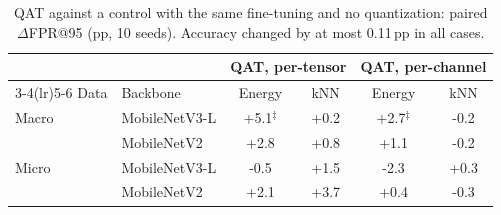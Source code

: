 \begin{table}[t]
\centering
\caption{QAT against a control with the same fine-tuning and no quantization: paired $\Delta$FPR@95 (pp, 10 seeds). Accuracy changed by at most 0.11\,pp in all cases.}
\label{tab:qat}
\setlength{\tabcolsep}{3pt}
\footnotesize
\begin{tabular}{ll cc cc}
\toprule
 & & \multicolumn{2}{c}{QAT, per-tensor} & \multicolumn{2}{c}{QAT, per-channel} \\
\cmidrule(lr){3-4}\cmidrule(lr){5-6}
Data & Backbone & Energy & kNN & Energy & kNN \\
\midrule
Macro & MobileNetV3-L & +5.1$^{\ddagger}$ & +0.2 & +2.7$^{\ddagger}$ & -0.2 \\
 & MobileNetV2 & +2.8 & +0.8 & +1.1 & -0.2 \\
\midrule
Micro & MobileNetV3-L & -0.5 & +1.5 & -2.3 & +0.3 \\
 & MobileNetV2 & +2.1 & +3.7 & +0.4 & -0.3 \\
\bottomrule
\end{tabular}
\end{table}